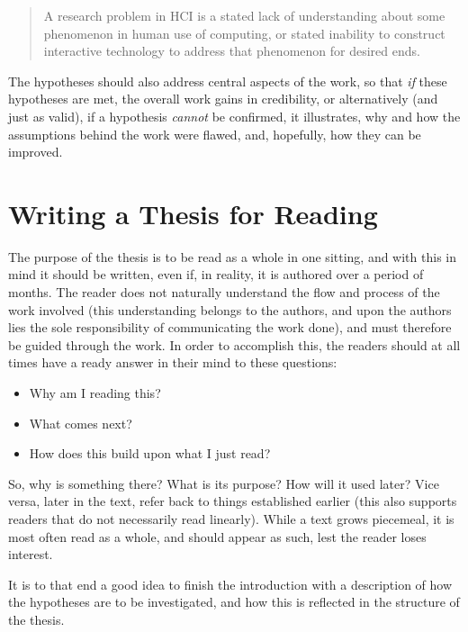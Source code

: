 \begin{quote}
  A research problem in HCI is a stated lack of understanding about some
  phenomenon in human use of computing, or stated inability to construct
  interactive technology to address that phenomenon for desired
  ends.~\cite[Def.\ 1]{Oulasvirta2016:POT2CCOHFICS2016}
\end{quote}


The hypotheses should also address central aspects of the work, so that
\emph{if} these hypotheses are met, the overall work gains in credibility,
or alternatively (and just as valid), if a hypothesis \emph{cannot} be
confirmed, it illustrates, why and how the assumptions behind the work were
flawed, and, hopefully, how they can be improved.

\section{Writing a Thesis for Reading}
\label{sec:writ-thes-read}

The purpose of the thesis is to be read as a whole in one sitting, and with
this in mind it should be written, even if, in reality, it is authored over
a period of months.  The reader does not naturally understand the flow and
process of the work involved (this understanding belongs to the authors, and
upon the authors lies the sole responsibility of communicating the work
done), and must therefore be guided through the work.  In order to
accomplish this, the readers should at all times have a ready answer in
their mind to these questions:

\begin{itemize}
\item Why am I reading this?
\item What comes next?
\item How does this build upon what I just read?
\end{itemize}

So, why is something there? What is its purpose? How will it used later?
Vice versa, later in the text, refer back to things established earlier
(this also supports readers that do not necessarily read linearly). While a
text grows piecemeal, it is most often read as a whole, and should appear as
such, lest the reader loses interest.

It is to that end a good idea to finish the introduction with a description
of how the hypotheses are to be investigated, and how this is reflected in
the structure of the thesis.

